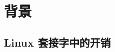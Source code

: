 \section{背景}
\label{socksdirect:sec:background}

\subsection{Linux 套接字中的开销}
\label{socksdirect:subsec:motivation}






